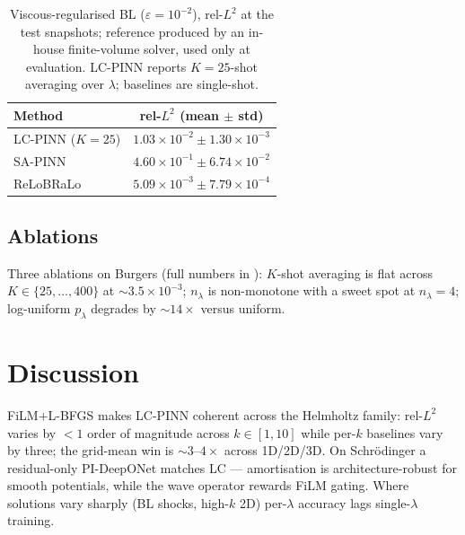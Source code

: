 \documentclass{article}
\theoremstyle{plain}
\theoremstyle{definition}
\theoremstyle{remark}
\begin{document}
\begin{table}[h]
\centering
\caption{Viscous-regularised BL ($\varepsilon\!=\!10^{-2}$),
rel-$L^2$ at the test snapshots; reference produced by an in-house
finite-volume solver, used only at evaluation. LC-PINN reports
$K\!=\!25$-shot averaging over $\lambda$; baselines are single-shot.}
\label{tab:bl}
\begin{tabular}{lc}
\toprule
Method & rel-$L^2$ (mean $\pm$ std) \\
\midrule
LC-PINN ($K\!=\!25$) & $1.03 \times 10^{-2} \pm 1.30 \times 10^{-3}$ \\
SA-PINN              & $4.60 \times 10^{-1} \pm 6.74 \times 10^{-2}$ \\
ReLoBRaLo            & $5.09 \times 10^{-3} \pm 7.79 \times 10^{-4}$ \\
\bottomrule
\end{tabular}
\end{table}

\subsection{Ablations}
\label{sec:results-ablations}

Three ablations on Burgers (full numbers in
): $K$-shot averaging is flat across
$K\!\in\!\{25,...,400\}$ at $\sim\!3.5\!\times\!10^{-3}$; $n_\lambda$
is non-monotone with a sweet spot at $n_\lambda\!=\!4$; log-uniform
$p_\lambda$ degrades by $\sim\!14\times$ versus uniform.


\section{Discussion}
\label{sec:discussion}

FiLM$+$L-BFGS makes LC-PINN coherent across the Helmholtz family:
rel-$L^2$ varies by $<\!1$ order of magnitude across $k\!\in\![1,10]$
while per-$k$ baselines vary by three; the grid-mean win is
$\sim\!3$--$4\times$ across 1D/2D/3D. On Schrödinger a residual-only
PI-DeepONet matches LC --- amortisation is architecture-robust for
smooth potentials, while the wave operator rewards FiLM gating.
Where solutions vary sharply (BL shocks, high-$k$ 2D) per-$\lambda$
accuracy lags single-$\lambda$ training.




\newpage
\appendix
\onecolumn
\end{document}
